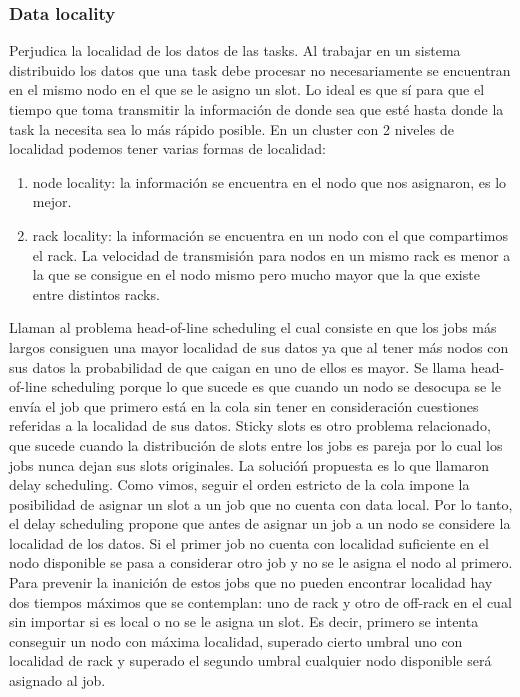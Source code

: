 \subsubsection{Data locality}
Perjudica la localidad de los datos de las tasks. Al trabajar en un sistema distribuido
los datos que una task debe procesar no necesariamente se encuentran en el mismo
nodo en el que se le asigno un slot. Lo ideal es que sí para que el tiempo que toma
transmitir la información de donde sea que esté hasta donde la task la necesita
sea lo más rápido posible. En un cluster con 2 niveles de localidad podemos tener
varias formas de localidad:
\begin{enumerate}
  \item node locality: la información se encuentra en el nodo que nos asignaron, es lo mejor.
  \item rack locality: la información se encuentra en un nodo con el que compartimos el 
    rack. La velocidad de transmisión para nodos en un mismo rack es menor a la que se consigue
    en el nodo mismo pero mucho mayor que la que existe entre distintos racks.
\end{enumerate}
Llaman al problema head-of-line scheduling el cual consiste en que los jobs más largos
consiguen una mayor localidad de sus datos ya que al tener más nodos con sus datos la 
probabilidad de que caigan en uno de ellos es mayor. Se llama head-of-line scheduling
porque lo que sucede es que cuando un nodo se desocupa se le envía el job que primero
está en la cola sin tener en consideración cuestiones referidas a la localidad de sus datos.
Sticky slots es otro problema relacionado, que sucede cuando la distribución de slots 
entre los jobs es pareja por lo cual los jobs nunca dejan sus slots originales.
La solucióń propuesta es lo que llamaron delay scheduling. Como vimos, seguir el orden 
estricto de la cola impone la posibilidad de asignar un slot a un job que no cuenta 
con data local. Por lo tanto, el delay scheduling propone que antes de asignar un job a un
nodo se considere la localidad de los datos. Si el primer job no cuenta con localidad suficiente
en el nodo disponible se pasa a considerar otro job y no se le asigna el nodo al primero.
Para prevenir la inanición de estos jobs que no pueden encontrar localidad hay 
dos tiempos máximos que se contemplan: uno de rack y otro de off-rack en el cual sin 
importar si es local o no se le asigna un slot. Es decir, primero se intenta conseguir
un nodo con máxima localidad, superado cierto umbral uno con localidad de rack y superado
el segundo umbral cualquier nodo disponible será asignado al job.

